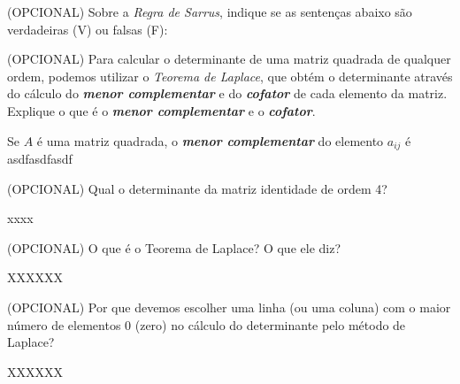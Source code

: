 \documentclass[pdftex, brazil, 12pt, oneside, addpoints]{exam}
\newcommand{\vf}[1][{}]{%
  \fillin[#1][0.25in]%
}
\begin{document}
\begin{questions}
\ifprintanswers
\else
\newpage
\fi

\question
(OPCIONAL) Sobre a \emph{Regra de Sarrus}, indique se as sentenças abaixo
são verdadeiras (V) ou falsas (F):

\question
(OPCIONAL) Para calcular o determinante de uma matriz quadrada de qualquer ordem, podemos
utilizar o \emph{Teorema de Laplace}, que obtém o determinante através do cálculo
do \emph{\textbf{menor complementar}} e do \emph{\textbf{cofator}} de cada elemento
da matriz. Explique o que é o \emph{\textbf{menor complementar}} e o
\emph{\textbf{cofator}}.
\begin{solution}
  Se $A$ é uma matriz quadrada, o \emph{\textbf{menor complementar}} do elemento $a_{ij}$
  é asdfasdfasdf
\end{solution}

\question
(OPCIONAL) Qual o determinante da matriz identidade de ordem 4?
\begin{solution}
  xxxx
\end{solution}

\question
(OPCIONAL) O que é o Teorema de Laplace? O que ele diz?
\begin{solution}
  XXXXXX
\end{solution}

\question
(OPCIONAL) Por que devemos escolher uma linha (ou  uma coluna) com o maior número
de elementos 0 (zero) no cálculo do determinante pelo método de
Laplace?
\begin{solution}
  XXXXXX
\end{solution}


\end{questions}
\end{document}
